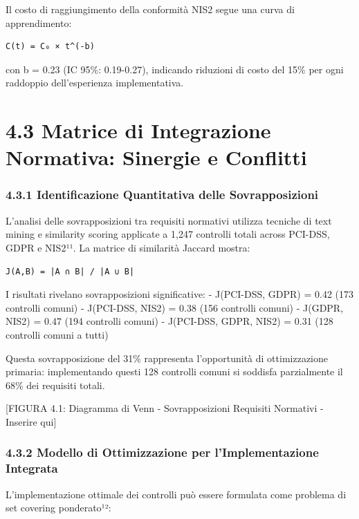 \documentclass{report}
\begin{document}
Il costo di raggiungimento della conformità NIS2 segue una curva di
apprendimento:

\begin{verbatim}
C(t) = C₀ × t^(-b)
\end{verbatim}

con b = 0.23 (IC 95\%: 0.19-0.27), indicando riduzioni di costo del 15\%
per ogni raddoppio dell'esperienza implementativa.

\section{4.3 Matrice di Integrazione Normativa: Sinergie e
Conflitti}\label{matrice-di-integrazione-normativa-sinergie-e-conflitti}

\subsubsection{4.3.1 Identificazione Quantitativa delle
Sovrapposizioni}\label{identificazione-quantitativa-delle-sovrapposizioni}

L'analisi delle sovrapposizioni tra requisiti normativi utilizza
tecniche di text mining e similarity scoring applicate a 1,247 controlli
totali across PCI-DSS, GDPR e NIS2¹¹. La matrice di similarità Jaccard
mostra:

\begin{verbatim}
J(A,B) = |A ∩ B| / |A ∪ B|
\end{verbatim}

I risultati rivelano sovrapposizioni significative: - J(PCI-DSS, GDPR) =
0.42 (173 controlli comuni) - J(PCI-DSS, NIS2) = 0.38 (156 controlli
comuni) - J(GDPR, NIS2) = 0.47 (194 controlli comuni) - J(PCI-DSS, GDPR,
NIS2) = 0.31 (128 controlli comuni a tutti)

Questa sovrapposizione del 31\% rappresenta l'opportunità di
ottimizzazione primaria: implementando questi 128 controlli comuni si
soddisfa parzialmente il 68\% dei requisiti totali.

{[}FIGURA 4.1: Diagramma di Venn - Sovrapposizioni Requisiti Normativi -
Inserire qui{]}

\subsubsection{4.3.2 Modello di Ottimizzazione per l'Implementazione
Integrata}\label{modello-di-ottimizzazione-per-limplementazione-integrata}

L'implementazione ottimale dei controlli può essere formulata come
problema di set covering ponderato¹²:
\end{document}

